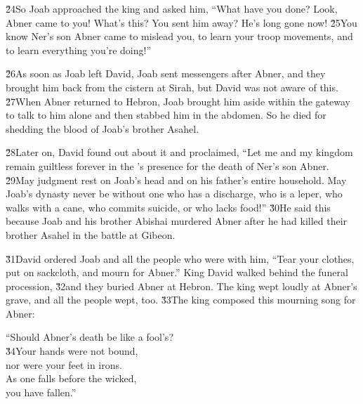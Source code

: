 \v{24}So Joab approached the king and asked him, ``What have you done? Look, Abner came to you! What's this? You sent him away? He's long gone now! \v{25}You know Ner's son Abner came to mislead you, to learn your troop movements, and to learn everything you're doing!''

\v{26}As soon as Joab left David, Joab sent messengers after Abner, and they brought him back from the cistern at Sirah, but David was not aware of this. \v{27}When Abner returned to Hebron, Joab brought him aside within the gateway to talk to him alone and then stabbed him in the abdomen. So he died for shedding the blood of Joab's brother Asahel.

\v{28}Later on, David found out about it and proclaimed, ``Let me and my kingdom remain guiltless forever in the 's presence for the death of Ner's son Abner. \v{29}May judgment rest on Joab's head and on his father's entire household. May Joab's dynasty never be without one who has a discharge, who is a leper, who walks with a cane, who commits suicide, or who lacks food!'' \v{30}He said this because Joab and his brother Abishai murdered Abner after he had killed their brother Asahel in the battle at Gibeon.

\v{31}David ordered Joab and all the people who were with him, ``Tear your clothes, put on sackcloth, and mourn for Abner.'' King David walked behind the funeral procession, \v{32}and they buried Abner at Hebron. The king wept loudly at Abner's grave, and all the people wept, too. \v{33}The king composed this mourning song for Abner:

\begin{poetry}
\poeml ``Should Abner's death be like a fool's? \\
\poeml \v{34}Your hands were not bound, \\
\poemlll       nor were your feet in irons. \\
\poeml As one falls before the wicked, \\
\poemll    you have fallen.''
\end{poetry}

